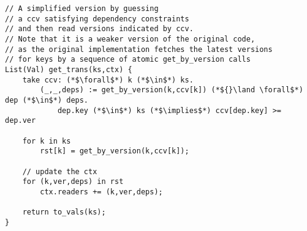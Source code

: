 \begin{mathpar}
\end{mathpar}
\begin{lstlisting}
// A simplified version by guessing
// a ccv satisfying dependency constraints
// and then read versions indicated by ccv.
// Note that it is a weaker version of the original code,
// as the original implementation fetches the latest versions
// for keys by a sequence of atomic get_by_version calls
List(Val) get_trans(ks,ctx) {
    take ccv: (*$\forall$*) k (*$\in$*) ks.
        (_,_,deps) := get_by_version(k,ccv[k]) (*${}\land \forall$*) dep (*$\in$*) deps.
            dep.key (*$\in$*) ks (*$\implies$*) ccv[dep.key] >= dep.ver

    for k in ks                 
        rst[k] = get_by_version(k,ccv[k]);

    // update the ctx
    for (k,ver,deps) in rst
        ctx.readers += (k,ver,deps);

    return to_vals(ks);
}                                   
\end{lstlisting}

